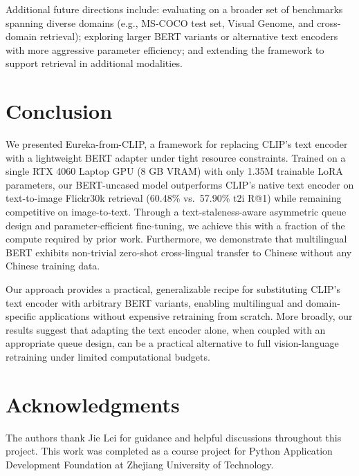 \documentclass[10pt,leqno]{amsart}
\begin{document}
Additional future directions include: evaluating on a broader set of benchmarks spanning diverse domains (e.g., MS-COCO test set, Visual Genome, and cross-domain retrieval); exploring larger BERT variants or alternative text encoders with more aggressive parameter efficiency; and extending the framework to support retrieval in additional modalities.

\section{Conclusion}

We presented Eureka-from-CLIP, a framework for replacing CLIP's text encoder with a lightweight BERT adapter under tight resource constraints. Trained on a single RTX 4060 Laptop GPU (8 GB VRAM) with only 1.35M trainable LoRA parameters, our BERT-uncased model outperforms CLIP's native text encoder on text-to-image Flickr30k retrieval (60.48\% vs.~57.90\% t2i R@1) while remaining competitive on image-to-text. Through a text-staleness-aware asymmetric queue design and parameter-efficient fine-tuning, we achieve this with a fraction of the compute required by prior work. Furthermore, we demonstrate that multilingual BERT exhibits non-trivial zero-shot cross-lingual transfer to Chinese without any Chinese training data.

Our approach provides a practical, generalizable recipe for substituting CLIP's text encoder with arbitrary BERT variants, enabling multilingual and domain-specific applications without expensive retraining from scratch. More broadly, our results suggest that adapting the text encoder alone, when coupled with an appropriate queue design, can be a practical alternative to full vision-language retraining under limited computational budgets.

\section*{Acknowledgments}

The authors thank Jie Lei for guidance and helpful discussions throughout this project. This work was completed as a course project for Python Application Development Foundation at Zhejiang University of Technology.

\bigskip
\end{document}
